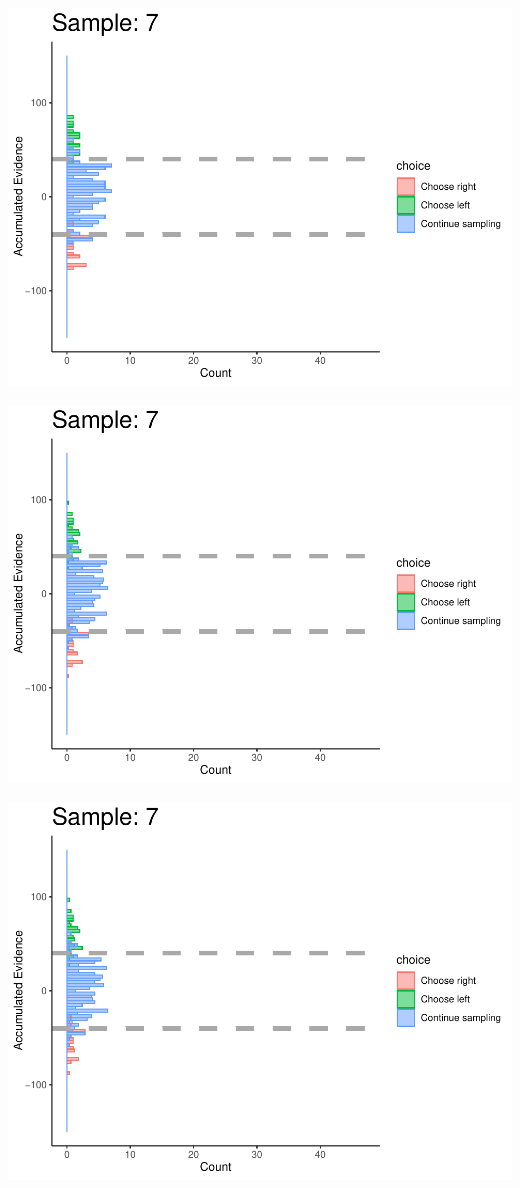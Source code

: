 \documentclass[
]{book}
\begin{document}
\begin{center}\includegraphics[width=0.8\linewidth]{LateNightBayes_files/figure-latex/collapsing_check-65} \end{center}

\begin{center}\includegraphics[width=0.8\linewidth]{LateNightBayes_files/figure-latex/collapsing_check-66} \end{center}

\begin{center}\includegraphics[width=0.8\linewidth]{LateNightBayes_files/figure-latex/collapsing_check-67} \end{center}
\end{document}
